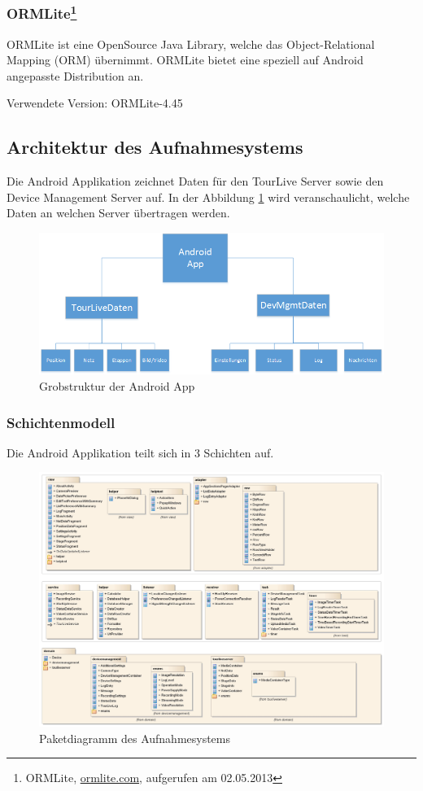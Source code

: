 \subsubsection{ORMLite\footnote{ORMLite, \url{ormlite.com}, aufgerufen am 02.05.2013}} ORMLite ist eine OpenSource Java Library, welche das Object-Relational Mapping (ORM) übernimmt. ORMLite bietet eine speziell auf Android angepasste Distribution an. 

Verwendete Version: ORMLite-4.45

\subsection{Architektur des Aufnahmesystems}
Die Android Applikation zeichnet Daten für den TourLive Server sowie den Device Management Server auf. In der Abbildung \ref{fig:grobstrukturandroid}
 wird veranschaulicht, welche Daten an welchen Server übertragen werden.

\begin{figure}[H]
	\centering
	\includegraphics[width=120mm]{images/android/uebersicht.png}
	\caption{Grobstruktur der Android App}
	\label{fig:grobstrukturandroid} 
\end{figure}

\subsubsection{Schichtenmodell}
Die Android Applikation teilt sich in 3 Schichten auf.

\begin{figure}[H]
	\centering
	\includegraphics[width=150mm]{images/android/schichten.jpg}
	\caption{Paketdiagramm des Aufnahmesystems}
\end{figure}

